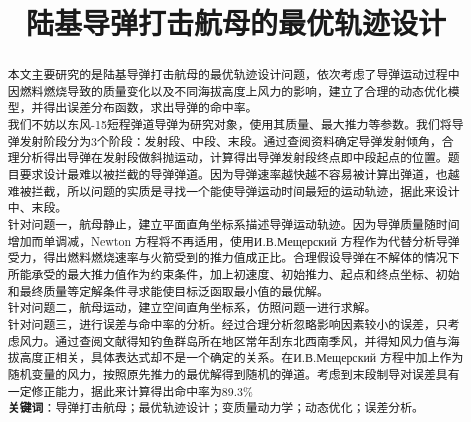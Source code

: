 \documentclass[UTF8]{article}
\title{\textbf{陆基导弹打击航母的最优轨迹设计}}
\author{}
\date{}
\begin{document}
\newpage
\thispagestyle{empty}
\maketitle
\begin{abstract}
本文主要研究的是陆基导弹打击航母的最优轨迹设计问题，依次考虑了导弹运动过程中因燃料燃烧导致的质量变化以及不同海拔高度上风力的影响，建立了合理的动态优化模型，并得出误差分布函数，求出导弹的命中率。\\
\indent 我们不妨以东风-15短程弹道导弹为研究对象，使用其质量、最大推力等参数。我们将导弹发射阶段分为3个阶段：发射段、中段、末段。通过查阅资料确定导弹发射倾角，合理分析得出导弹在发射段做斜抛运动，计算得出导弹发射段终点即中段起点的位置。题目要求设计最难以被拦截的导弹弹道。因为导弹速率越快越不容易被计算出弹道，也越难被拦截，所以问题的实质是寻找一个能使导弹运动时间最短的运动轨迹，据此来设计中、末段。\\
\indent 针对问题一，航母静止，建立平面直角坐标系描述导弹运动轨迹。因为导弹质量随时间增加而单调减，Newton 方程将不再适用，使用И.В.Мещерский 方程作为代替分析导弹受力，得出燃料燃烧速率与火箭受到的推力值成正比。合理假设导弹在不解体的情况下所能承受的最大推力值作为约束条件，加上初速度、初始推力、起点和终点坐标、初始和最终质量等定解条件寻求能使目标泛函取最小值的最优解。\\
\indent 针对问题二，航母运动，建立空间直角坐标系，仿照问题一进行求解。\\
\indent 针对问题三，进行误差与命中率的分析。经过合理分析忽略影响因素较小的误差，只考虑风力。通过查阅文献得知钓鱼群岛所在地区常年刮东北西南季风，并得知风力值与海拔高度正相关，具体表达式却不是一个确定的关系。在И.В.Мещерский 方程中加上作为随机变量的风力，按照原先推力的最优解得到随机的弹道。考虑到末段制导对误差具有一定修正能力，据此来计算得出命中率为89.3\%\\
\textbf{关键词}：导弹打击航母；最优轨迹设计；变质量动力学；动态优化；误差分析。
\end{abstract}
\end{document}
